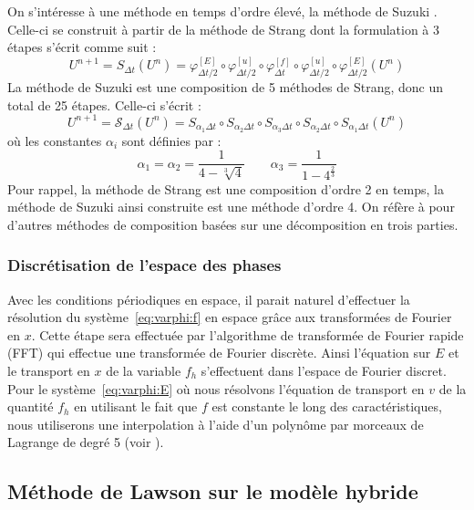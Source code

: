 On s'intéresse à une méthode en temps d'ordre élevé, la méthode de Suzuki \cite{Suzuki:1990}. Celle-ci se construit à partir de la méthode de Strang \cite{Strang:1968} dont la formulation à 3 étapes s'écrit comme suit :
\begin{equation}
  U^{n+1} = S_{\Delta t}(U^n) = \varphi^{[E]}_{\Delta t/2} \circ \varphi^{[u]}_{\Delta t/2} \circ \varphi^{[f]}_{\Delta t} \circ \varphi^{[u]}_{\Delta t/2} \circ \varphi^{[E]}_{\Delta t/2} (U^n) 
  \label{eq:strang}
\end{equation}
La méthode de Suzuki est une composition de 5 méthodes de Strang, donc un total de 25 étapes. Celle-ci s'écrit :
\begin{equation}
  U^{n+1} = \mathcal{S}_{\Delta t}(U^n) = S_{\alpha_1\Delta t} \circ S_{\alpha_2\Delta t} \circ S_{\alpha_3\Delta t} \circ S_{\alpha_2\Delta t} \circ S_{\alpha_1\Delta t} (U^n)
  \label{eq:suzuki}
\end{equation}
où les constantes $\alpha_i$ sont définies par :
$$
  \alpha_1 = \alpha_2 = \frac{1}{4 - \sqrt[3]{4}} \qquad \alpha_3 = \frac{1}{1- 4^{\frac{2}{3}}}
$$
Pour rappel, la méthode de Strang est une composition d'ordre 2 en temps, la méthode de Suzuki ainsi construite est une méthode d'ordre 4. 
On réfère à \cite{Casas:2020} pour d'autres méthodes de composition basées sur une décomposition en trois parties. 

\subsubsection{Discrétisation de l'espace des phases}

Avec les conditions périodiques en espace, il parait naturel d'effectuer la résolution du système~\eqref{eq:varphi:f} en espace grâce aux transformées de Fourier en $x$. Cette étape sera effectuée par l'algorithme de transformée de Fourier rapide (FFT) qui effectue une transformée de Fourier discrète. Ainsi l'équation sur $E$ et le transport en $x$ de la variable $f_h$ s'effectuent dans l'espace de Fourier discret. Pour le système~\eqref{eq:varphi:E} où nous résolvons l'équation de transport en $v$ de la quantité $f_h$ en utilisant le fait que $f$ est constante le long des  caractéristiques, nous utiliserons une interpolation à l'aide d'un polynôme par morceaux de Lagrange de degré 5 (voir \cite{Charles:2013}). 



\subsection{Méthode de Lawson sur le modèle hybride}\label{ssec:lawson}

